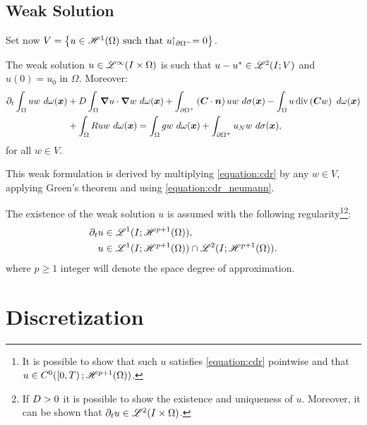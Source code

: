 \newpage
\subsection{Weak Solution}

Set now $V = \left\{ u \in \mathscr{H}^{1}(\Omega) \text{ such that } u \!\!\restriction_{\partial \Omega^-} = 0 \right\}$.

\begin{definition}
    The weak solution $u \in \mathscr{L}^{\infty}(I \times \Omega)$ is such that $u - u^* \in \mathscr{L}^{2}(I; V)$ and $u(0) = u_0$ in $\Omega$. Moreover:
    \begin{align}
        \partial_t \int_{\Omega} u w ~ d \omega(\bm{x}) &+ D \int_{\Omega} \bm{\nabla} u \cdot \bm{\nabla} w ~ d \omega(\bm{x}) + \int_{\partial \Omega^+} \left( \bm{C} \cdot \bm{n} \right) u w ~ d \sigma(\bm{x}) - \int_{\Omega} u \operatorname*{div} \left( \bm{C} w \right) ~ d \omega(\bm{x}) \notag \\
        &+ \int_{\Omega} R u w ~ d \omega(\bm{x}) = \int_{\Omega} g w ~ d \omega(\bm{x}) + \int_{\partial \Omega^+} u_N w ~ d \sigma(\bm{x}),
    \end{align}
    for all $w \in V$.
\end{definition}
This weak formulation is derived by multiplying \cref{equation:cdr} by any $w \in V$, applying Green's theorem and using \cref{equation:cdr_neumann}. %

The existence of the weak solution $u$ is assumed with the following regularity\footnote{It is possible to show that such $u$ satisfies \cref{equation:cdr} pointwise and that $u \in C^0(\left[ 0, T \right); \mathscr{H}^{p + 1}(\Omega))$.}\footnote{If $D > 0$ it is possible to show the existence and uniqueness of $u$. Moreover, it can be shown that $\partial_t u \in \mathscr{L}^{2}(I \times \Omega)$.}: %
\begin{align}
    \partial_t u & \in \mathscr{L}^{1}(I; \mathscr{H}^{p + 1}(\Omega)), \label{equation:assumption_regularity_1} \\
    u & \in \mathscr{L}^{1}(I; \mathscr{H}^{p + 1}(\Omega)) \cap \mathscr{L}^{2}(I; \mathscr{H}^{p + 1}(\Omega)). \label{equation:assumption_regularity_2}
\end{align}
where $p \geq 1$ integer will denote the space degree of approximation.

\newpage
\section{Discretization}

